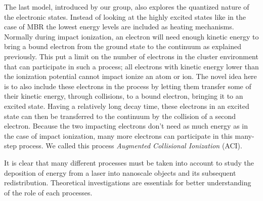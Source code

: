 The last model, introduced by our group, also explores the quantized nature of
the electronic states. Instead of looking at the highly excited states like
in the case of MBR the lowest energy levels are included as heating mechanisms.
Normally during impact ionization, an electron will need enough kinetic energy
to bring a bound electron from the ground state to the continuum as explained
previously. This put a limit on the number of electrons in the cluster
environment that can participate in such a process; all electrons with
kinetic energy lower than the ionization potential cannot impact ionize an atom
or ion. The novel idea here is to also include these electrons in the process
by letting them transfer some of their kinetic energy, through collisions, to a
bound electron, bringing it to an excited state. Having a relatively long decay
time, these electrons in an excited state can then be transferred to the
continuum by the collision of a second electron. Because the two impacting
electrons don't need as much energy as in the case of impact ionization, many
more electrons can participate in this many-step process. We called this
process \textit{Augmented Collisional Ionization} (ACI).

It is clear that many different processes must be taken into account to study
the deposition of energy from a laser into nanoscale objects and its subsequent
redistribution. Theoretical investigations are essentials for better
understanding of the role of each processes.


